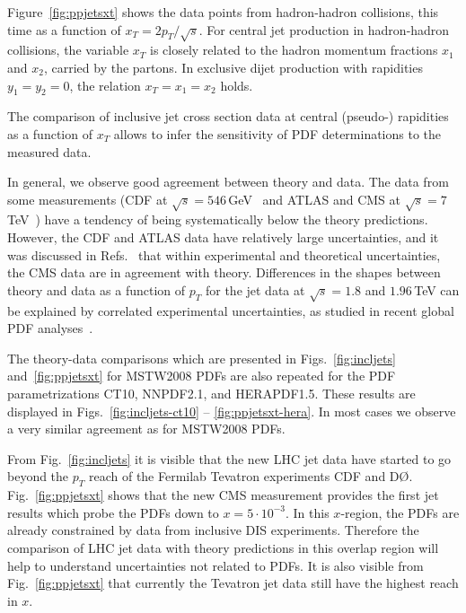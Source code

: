 \documentclass[11pt]{article}
\begin{document}
Figure~\ref{fig:ppjetsxt} shows the data points
from hadron-hadron collisions, this time as a function 
of $x_T = 2p_T/\sqrt{s}$.
For central jet production in hadron-hadron collisions, 
the variable $x_T$ is closely related to the hadron 
momentum fractions $x_1$ and $x_2$, carried by the partons.
In exclusive dijet production with
rapidities $y_1=y_2=0$, the relation $x_T= x_1 = x_2$ holds.

The comparison of inclusive jet cross section data at central 
(pseudo-) rapidities as a function of $x_T$
allows to infer the sensitivity of PDF determinations 
to the measured data.

In general, we observe good agreement between theory and data.
The data from some measurements 
(CDF at $\sqrt{s}=546\,$GeV~\cite{Abe:1992bk} and 
ATLAS and CMS at $\sqrt{s}=7\,$TeV~\cite{:2010wv,:2011me})
have a tendency of being systematically below 
the theory predictions.
However, the CDF and ATLAS data have relatively large uncertainties,
and it was discussed in Refs.~\cite{:2011me,Rabbertz:2011} that
within experimental and theoretical uncertainties, 
the CMS data are in agreement with theory.
Differences in the shapes between theory and data as a function
of $p_T$ for the jet data at $\sqrt{s}=1.8$ and $1.96\,$TeV
can be explained by correlated experimental uncertainties,
as studied in recent global 
PDF analyses~\cite{Martin:2009iq,Lai:2010vv,Ball:2011mu}.


The theory-data comparisons which are presented 
in Figs.~\ref{fig:incljets} and~\ref{fig:ppjetsxt}
for MSTW2008 PDFs are also repeated 
for the PDF parametrizations CT10, NNPDF2.1, and HERAPDF1.5.
These results are displayed in
Figs.~\ref{fig:incljets-ct10} -- \ref{fig:ppjetsxt-hera}.
In most cases we observe a very similar agreement as for MSTW2008 PDFs.


From Fig.~\ref{fig:incljets}
it is visible that the new LHC jet data have started to go beyond 
the $p_T$ reach of the Fermilab Tevatron experiments CDF and D\O.
Fig.~\ref{fig:ppjetsxt} shows that the new CMS measurement
provides the first jet results which probe the PDFs down 
to $x = 5\cdot10^{-3}$.
In this $x$-region, the PDFs are already constrained by
data from inclusive DIS experiments.
Therefore the comparison of LHC jet data with theory predictions in this
overlap region will help to understand
uncertainties not related to PDFs.
It is also visible from Fig.~\ref{fig:ppjetsxt} that 
currently the Tevatron jet data still have the highest reach in $x$.
\end{document}
